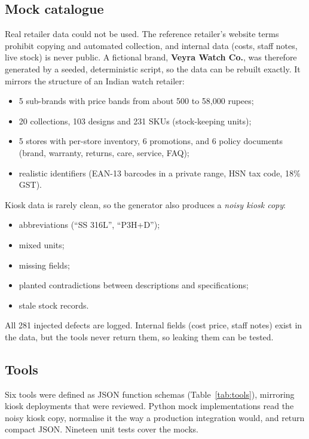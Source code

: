 \documentclass[11pt,a4paper]{article}
\begin{document}
\subsection{Mock catalogue}\label{sec:catalogue}
Real retailer data could not be used. The reference retailer's website terms prohibit copying and automated
collection, and internal data (costs, staff notes, live stock) is never public. A fictional brand,
\textbf{Veyra Watch Co.}, was therefore generated by a seeded, deterministic script, so the data can be rebuilt
exactly. It mirrors the structure of an Indian watch retailer:
\begin{itemize}
  \item 5 sub-brands with price bands from about 500 to 58,000 rupees;
  \item 20 collections, 103 designs and 231 SKUs (stock-keeping units);
  \item 5 stores with per-store inventory, 6 promotions, and 6 policy documents (brand, warranty, returns, care,
        service, FAQ);
  \item realistic identifiers (EAN-13 barcodes in a private range, HSN tax code, 18\% GST).
\end{itemize}

Kiosk data is rarely clean, so the generator also produces a \emph{noisy kiosk copy}:
\begin{itemize}
  \item abbreviations (``SS 316L'', ``P3H+D'');
  \item mixed units;
  \item missing fields;
  \item planted contradictions between descriptions and specifications;
  \item stale stock records.
\end{itemize}
All 281 injected defects are logged. Internal fields (cost price, staff notes) exist in the data, but the tools never
return them, so leaking them can be tested.

\subsection{Tools}
Six tools were defined as JSON function schemas (Table~\ref{tab:tools}), mirroring kiosk deployments that were
reviewed. Python mock implementations read the noisy kiosk copy, normalise it the way a production integration would,
and return compact JSON. Nineteen unit tests cover the mocks.
\end{document}
